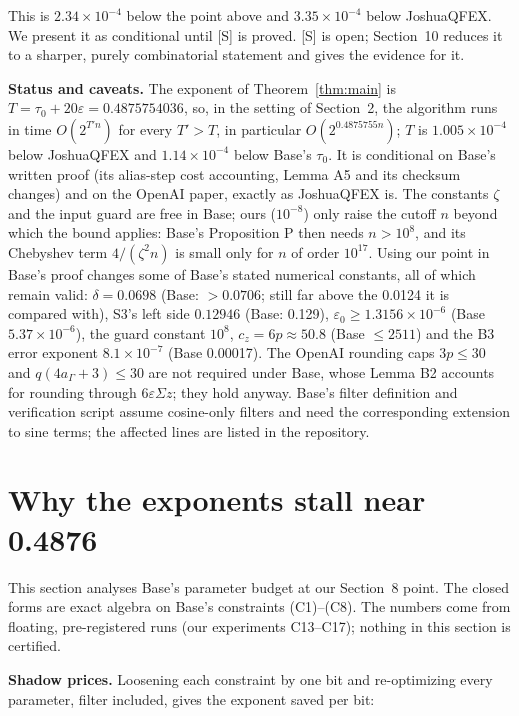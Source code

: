 \documentclass[11pt]{article}
\newcommand{\eps}{\varepsilon}
\theoremstyle{plain}
\begin{document}
This is $2.34\times10^{-4}$ below the point above and $3.35\times10^{-4}$ below JoshuaQFEX. We present it as conditional until [S] is proved. [S] is open; Section~10 reduces it to a sharper, purely combinatorial statement and gives the evidence for it.

\textbf{Status and caveats.} The exponent of Theorem~\ref{thm:main} is $T = \tau_0 + 20\eps = 0.4875754036$, so, in the setting of Section~2, the algorithm runs in time $O(2^{T' n})$ for every $T' > T$, in particular $O(2^{0.4875755n})$; $T$ is $1.005\times10^{-4}$ below JoshuaQFEX and $1.14\times10^{-4}$ below Base's $\tau_0$. It is conditional on Base's written proof (its alias-step cost accounting, Lemma A5 and its checksum changes) and on the OpenAI paper, exactly as JoshuaQFEX is. The constants $\zeta$ and the input guard are free in Base; ours ($10^{-8}$) only raise the cutoff $n$ beyond which the bound applies: Base's Proposition P then needs $n > 10^8$, and its Chebyshev term $4/(\zeta^2 n)$ is small only for $n$ of order $10^{17}$. Using our point in Base's proof changes some of Base's stated numerical constants, all of which remain valid: $\delta = 0.0698$ (Base: $> 0.0706$; still far above the 0.0124 it is compared with), S3's left side $0.12946$ (Base: 0.129), $\eps_0 \ge 1.3156\times10^{-6}$ (Base $5.37\times10^{-6}$), the guard constant $10^8$, $c_z = 6p \approx 50.8$ (Base $\le 2511$) and the B3 error exponent $8.1\times10^{-7}$ (Base 0.00017). The OpenAI rounding caps $3p \le 30$ and $q(4a_\Gamma + 3) \le 30$ are not required under Base, whose Lemma B2 accounts for rounding through $6\eps\Sigma z$; they hold anyway. Base's filter definition and verification script assume cosine-only filters and need the corresponding extension to sine terms; the affected lines are listed in the repository.

\section{Why the exponents stall near 0.4876}

This section analyses Base's parameter budget at our Section~8 point. The closed forms are exact algebra on Base's constraints (C1)--(C8). The numbers come from floating, pre-registered runs (our experiments C13--C17); nothing in this section is certified.

\textbf{Shadow prices.} Loosening each constraint by one bit and re-optimizing every parameter, filter included, gives the exponent saved per bit:
\end{document}
